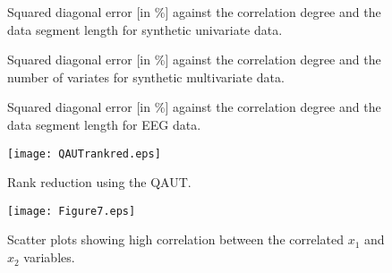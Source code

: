 \documentclass[review]{elsarticle}
\theoremstyle{plain}
\theoremstyle{remark}
\theoremstyle{plain}
\theoremstyle{definition}
\theoremstyle{prop}
\theoremstyle{definition}
\theoremstyle{plain}
\theoremstyle{plain}
\begin{document}
\begin{figure}[t]
\centering
{}
\hfil
{}
\hfil
{}
\caption{\label{fig:synthetic_univariate}Squared diagonal error [in $\%$] against the correlation degree and the data segment length for synthetic univariate data.}
\end{figure}

\begin{figure}[t]
\centering
{}
\hfil
{}
\hfil
{}
\caption{\label{fig:synthetic_multivariate}Squared diagonal error [in $\%$] against the correlation degree and the number of variates for synthetic multivariate data.}
\end{figure}

\begin{figure}[t]
\centering
{}
\vspace{-1mm}
\vspace{-1mm}
\vspace{-1mm}
\caption{\label{fig:EEG}Squared diagonal error [in $\%$] against the correlation degree and the data segment length for EEG data.}
\end{figure}

\begin{figure}[t]
\centering
{\texttt{[image: QAUTrankred.eps]}}
\caption{\label{fig:QAUTrankred}Rank reduction using the QAUT.}
\end{figure}

\begin{figure}[t]
\centering
{\texttt{[image: Figure7.eps]}}
\caption{\label{fig:RankRed1}Scatter plots showing high correlation between the correlated $x_1$ and $x_2$ variables.}
\end{figure}
\end{document}
